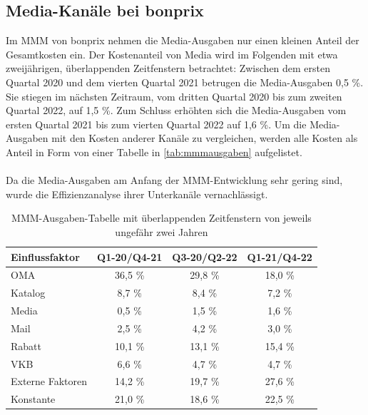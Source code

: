 \subsection{Media-Kanäle bei bonprix} 
\label{MMMbeiBonprix}
Im \ac{MMM} von bonprix nehmen die Media-Ausgaben nur einen kleinen Anteil der Gesamtkosten ein. Der Kostenanteil von Media wird im Folgenden mit etwa zweijährigen, überlappenden Zeitfenstern betrachtet: Zwischen dem ersten Quartal 2020 und dem vierten Quartal 2021 betrugen die Media-Ausgaben 0,5 \%. Sie stiegen im nächsten Zeitraum, vom dritten Quartal 2020 bis zum zweiten Quartal 2022, auf 1,5 \%. Zum Schluss erhöhten sich die Media-Ausgaben vom ersten Quartal 2021 bis zum vierten Quartal 2022 auf 1,6 \%. Um die Media-Ausgaben mit den Kosten anderer Kanäle zu vergleichen, werden alle Kosten als Anteil in Form von einer Tabelle in \autoref{tab:mmmausgaben} aufgelistet. \\\\
Da die Media-Ausgaben am Anfang der \ac{MMM}-Entwicklung sehr gering sind, wurde die Effizienzanalyse ihrer Unterkanäle vernachlässigt.  
\begin{table}[h!]
\centering
\renewcommand{\arraystretch}{1.3}
\setlength{\tabcolsep}{10pt}
\begin{tabular}{|l|c|c|c|}
\hline
\textbf{Einflussfaktor} & \textbf{Q1-20/Q4-21} & \textbf{Q3-20/Q2-22} & \textbf{Q1-21/Q4-22} \\ \hline
OMA                    & 36,5 \%               & 29,8 \%               & 18,0 \%               \\ \hline
Katalog                & 8,7 \%                & 8,4 \%                & 7,2 \%                \\ \hline
Media                  & 0,5 \%                & 1,5 \%                & 1,6 \%                \\ \hline
Mail                   & 2,5 \%                & 4,2 \%                & 3,0 \%                \\ \hline
Rabatt                 & 10,1 \%               & 13,1 \%               & 15,4 \%               \\ \hline
VKB                    & 6,6 \%                & 4,7 \%                & 4,7 \%                \\ \hline
Externe Faktoren       & 14,2 \%               & 19,7 \%               & 27,6 \%               \\ \hline
Konstante              & 21,0 \%               & 18,6 \%               & 22,5 \%               \\ \hline
\end{tabular}
\caption{\ac{MMM}-Ausgaben-Tabelle mit überlappenden Zeitfenstern von jeweils ungefähr zwei Jahren}
\label{tab:mmmausgaben}
\end{table}
